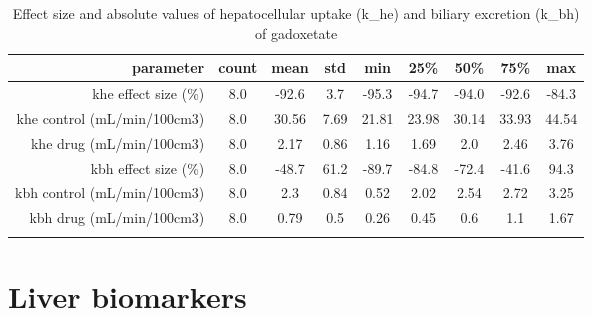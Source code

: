 \documentclass{epflreport}%
\begin{document}
%
\begin{longtable}{rcccccccc}%
\hline%
parameter&count&mean&std&min&25\%&50\%&75\%&max\\%
\hline%
khe effect size (\%)&8.0&{-}92.6&3.7&{-}95.3&{-}94.7&{-}94.0&{-}92.6&{-}84.3\\%
khe control (mL/min/100cm3)&8.0&30.56&7.69&21.81&23.98&30.14&33.93&44.54\\%
khe drug (mL/min/100cm3)&8.0&2.17&0.86&1.16&1.69&2.0&2.46&3.76\\%
kbh effect size (\%)&8.0&{-}48.7&61.2&{-}89.7&{-}84.8&{-}72.4&{-}41.6&94.3\\%
kbh control (mL/min/100cm3)&8.0&2.3&0.84&0.52&2.02&2.54&2.72&3.25\\%
kbh drug (mL/min/100cm3)&8.0&0.79&0.5&0.26&0.45&0.6&1.1&1.67\\%
\hline%
\caption{Effect size and absolute values of hepatocellular uptake (k\_he) and biliary excretion (k\_bh) of gadoxetate} \\%
\end{longtable}%
\clearpage%
\section{Liver biomarkers}%
\label{sec:Liverbiomarkers}%
\end{document}
